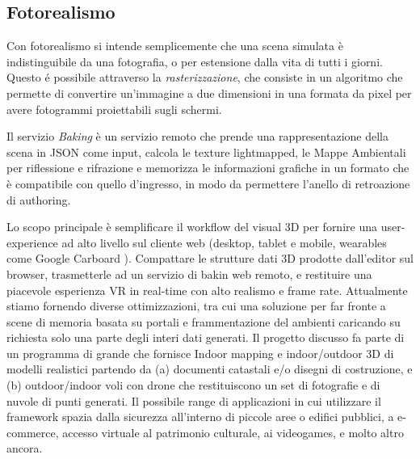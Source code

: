 
\newpage

\subsection{Fotorealismo}
\label{sec:conclusions_section_2_sub_3}
Con fotorealismo si intende semplicemente che una scena simulata \`e indistinguibile da una fotografia, o per estensione
dalla vita di tutti i giorni. Questo \'e possibile attraverso la \emph{rasterizzazione}, che consiste in un algoritmo che
permette di convertire un'immagine a due dimensioni in una formata da pixel per avere fotogrammi proiettabili sugli schermi.

Il servizio \emph{Baking} \`e un servizio remoto che prende una rappresentazione della scena in JSON come input,
calcola le texture lightmapped, le Mappe Ambientali per riflessione e rifrazione e memorizza le informazioni grafiche
in un formato che \`e compatibile con quello d'ingresso, in modo da permettere l'anello di retroazione di authoring.


Lo scopo principale \`e semplificare il workflow del visual 3D per fornire una user-experience ad alto livello
sul cliente web (desktop, tablet e mobile, wearables come Google Carboard ).
Compattare le strutture dati 3D prodotte dall'editor sul browser, trasmetterle ad un servizio di bakin web remoto,
e restituire una piacevole esperienza VR in real-time con alto realismo e frame rate.
Attualmente stiamo fornendo diverse ottimizzazioni, tra cui una soluzione per far fronte a scene di memoria basata
 su portali e frammentazione del ambienti caricando su richiesta solo una parte degli interi dati generati.
Il progetto discusso fa parte di un programma di grande che fornisce Indoor mapping e indoor/outdoor 3D di modelli realistici
partendo da (a) documenti catastali e/o disegni di costruzione, e (b) outdoor/indoor voli con drone che restituiscono
un set di fotografie e di nuvole di punti generati.
Il possibile range di applicazioni in cui utilizzare il framework spazia dalla sicurezza all'interno di piccole aree o edifici pubblici, a e-commerce,
accesso virtuale al patrimonio culturale, ai videogames, e molto altro ancora.

